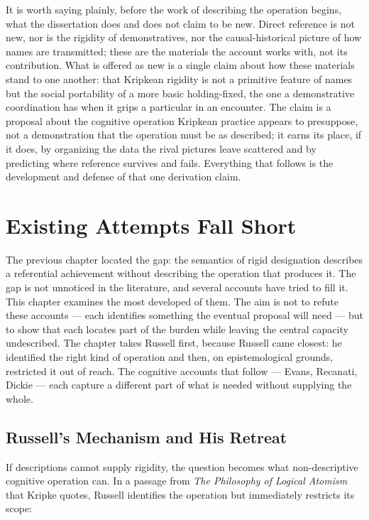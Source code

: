 \documentclass[12pt,a4paper]{article}
\begin{document}
It is worth saying plainly, before the work of describing the operation begins, what the dissertation does and does not claim to be new. Direct reference is not new, nor is the rigidity of demonstratives, nor the causal-historical picture of how names are transmitted; these are the materials the account works with, not its contribution. What is offered as new is a single claim about how these materials stand to one another: that Kripkean rigidity is not a primitive feature of names but the social portability of a more basic holding-fixed, the one a demonstrative coordination has when it grips a particular in an encounter. The claim is a proposal about the cognitive operation Kripkean practice appears to presuppose, not a demonstration that the operation must be as described; it earns its place, if it does, by organizing the data the rival pictures leave scattered and by predicting where reference survives and fails. Everything that follows is the development and defense of that one derivation claim.

\section{Existing Attempts Fall Short}\label{existing-attempts-fall-short}

The previous chapter located the gap: the semantics of rigid designation describes a referential achievement without describing the operation that produces it. The gap is not unnoticed in the literature, and several accounts have tried to fill it. This chapter examines the most developed of them. The aim is not to refute these accounts --- each identifies something the eventual proposal will need --- but to show that each locates part of the burden while leaving the central capacity undescribed. The chapter takes Russell first, because Russell came closest: he identified the right kind of operation and then, on epistemological grounds, restricted it out of reach. The cognitive accounts that follow --- Evans, Recanati, Dickie --- each capture a different part of what is needed without supplying the whole.

\subsection{Russell's Mechanism and His Retreat}\label{russells-mechanism-and-his-retreat}

If descriptions cannot supply rigidity, the question becomes what non-descriptive cognitive operation can. In a passage from \emph{The Philosophy of Logical Atomism} that Kripke quotes, Russell identifies the operation but immediately restricts its scope:
\end{document}
